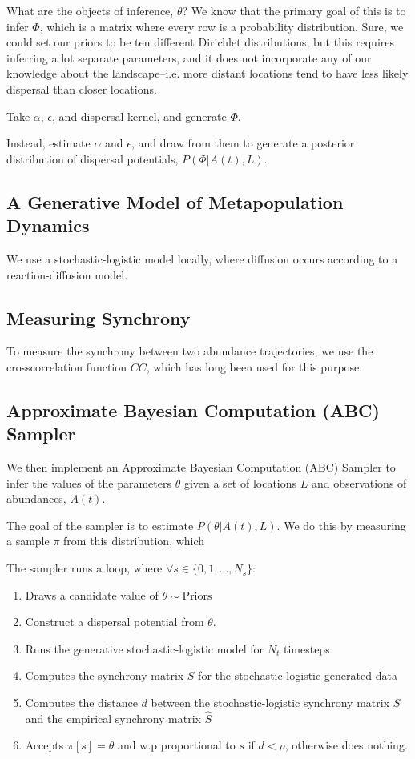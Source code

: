 \documentclass[]{article}
\begin{document}
What are the objects of inference, $\theta$? We know that the primary goal of this 
is to infer $\Phi$, which is a matrix where every row is a probability distribution.
Sure, we could set our priors to be ten different Dirichlet distributions, but this requires
inferring a lot separate parameters, and it does not incorporate any of our knowledge about the landscape--i.e. more distant locations tend to have less likely dispersal than closer locations.


Take $\alpha$, $\epsilon$, and dispersal kernel, and generate $\Phi$.

Instead, estimate $\alpha$ and $\epsilon$, and draw from them to generate a
posterior distribution of dispersal potentials, $P(\Phi | A(t), L)$.


\subsection{A Generative Model of Metapopulation Dynamics}

We use a stochastic-logistic model locally, where diffusion occurs according to a reaction-diffusion model.



\subsection{Measuring Synchrony}

To measure the synchrony between two abundance trajectories, we use the crosscorrelation function $CC$, which has long been used for this purpose. 


\subsection{Approximate Bayesian Computation (ABC) Sampler}

We then implement an Approximate Bayesian Computation (ABC) Sampler to infer
the values of the parameters $\theta$ given a set of locations $L$ and observations of 
abundances, $A(t)$. 

The goal of the sampler is to estimate $P(\theta | A(t), L)$. We do this by measuring a sample $\pi$ from this distribution, which 

The sampler runs a loop, where $\forall s \in \{0,1,\dots,N_s\}$: 
\begin{enumerate}
    \item Draws a candidate value of $\theta \sim \text{Priors}$
    \item Construct a dispersal potential from $\theta$.
    \item Runs the generative stochastic-logistic model for $N_t$ timesteps
    \item Computes the synchrony matrix $S$ for the stochastic-logistic generated data
    \item Computes the distance $d$ between the stochastic-logistic synchrony matrix $S$ and the empirical synchrony matrix $\hat{S}$
    \item Accepts $\pi[s] = \theta$ and w.p proportional to $s$ if $d  < \rho$, otherwise does nothing.
\end{enumerate}
\end{document}
